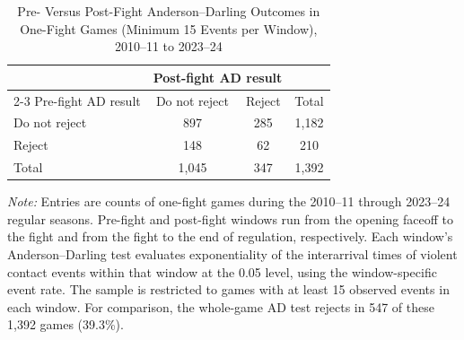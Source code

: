 \begin{table}[htbp]
\centering
\caption{Pre- Versus Post-Fight Anderson--Darling Outcomes in One-Fight Games (Minimum 15 Events per Window), 2010--11 to 2023--24}
\label{tab:one_fight_AD_rejection_min_15_20102011_20232024}
\small
\renewcommand{\arraystretch}{1.15}
\setlength{\tabcolsep}{6pt}

\begin{tabular*}{0.78\textwidth}{@{\extracolsep{\fill}}lccc}
\toprule
 & \multicolumn{2}{c}{Post-fight AD result} & \\
\cmidrule(lr){2-3}
Pre-fight AD result & Do not reject & Reject & Total \\
\midrule
Do not reject & 897 & 285 & 1,182 \\
Reject & 148 & 62 & 210 \\
\midrule
Total & 1,045 & 347 & 1,392 \\
\bottomrule
\end{tabular*}

\vspace{0.4em}
\parbox{0.78\textwidth}{
\footnotesize
\textit{Note:} Entries are counts of one-fight games during the 2010--11 through 2023--24 regular seasons. Pre-fight and post-fight windows run from the opening faceoff to the fight and from the fight to the end of regulation, respectively. Each window's Anderson--Darling test evaluates exponentiality of the interarrival times of violent contact events within that window at the 0.05 level, using the window-specific event rate. The sample is restricted to games with at least 15 observed events in each window. For comparison, the whole-game AD test rejects in 547 of these 1,392 games (39.3\%).
}
\end{table}
